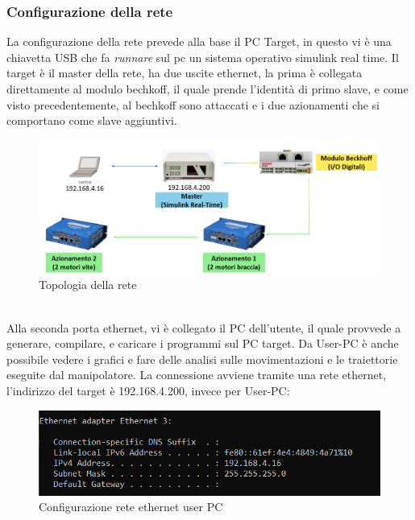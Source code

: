 \subsubsection{Configurazione della rete}
La configurazione della rete prevede alla base il PC Target, in questo vi è una chiavetta USB che fa \textit{runnare} sul pc un sistema operativo simulink real time. Il target è il master della rete, ha due uscite ethernet, la prima è collegata direttamente al modulo bechkoff, il quale prende l'identità di primo slave, e come visto precedentemente, al bechkoff sono attaccati e i due azionamenti che si comportano come slave aggiuntivi.
\begin{figure}[ht]
\begin{center}
    \includegraphics[scale=0.5]{Immagini/Sperimentale/Topology.PNG}
    \caption{Topologia della rete}
    \label{fig:NetTopology1}
\end{center}
\end{figure}
\\Alla seconda porta ethernet, vi è collegato il PC dell'utente, il quale provvede a generare, compilare, e caricare i programmi sul PC target. Da User-PC è anche possibile vedere i grafici e fare delle analisi sulle movimentazioni e le traiettorie eseguite dal manipolatore. La connessione avviene tramite una rete ethernet, l'indirizzo del target è 192.168.4.200, invece per User-PC:
\begin{figure}[ht]
\begin{center}
    \includegraphics[scale=0.7]{Immagini/Sperimentale/ConfEthernet.png}
    \caption{Configurazione rete ethernet user PC}
    \label{fig:ConfEthernet}
\end{center}
\end{figure}
